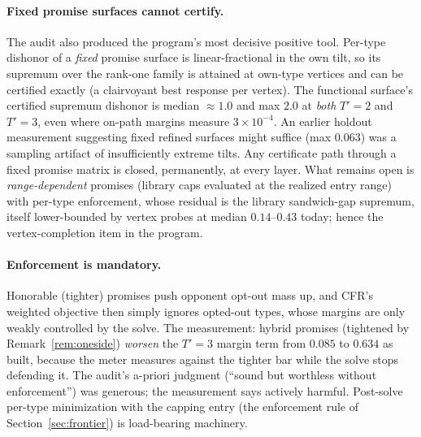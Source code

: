 \documentclass[11pt]{article}
\theoremstyle{plain}
\theoremstyle{definition}
\theoremstyle{remark}
\begin{document}
\paragraph{Fixed promise surfaces cannot certify.} The audit also
produced the program's most decisive positive tool. Per-type dishonor
of a \emph{fixed} promise surface is linear-fractional in the own
tilt, so its supremum over the rank-one family is attained at own-type
vertices and can be certified exactly (a clairvoyant best response per
vertex). The functional surface's certified supremum dishonor is
median ${\approx}1.0$ and max $2.0$ at \emph{both} $T'{=}2$ and
$T'{=}3$, even where on-path margins measure $3\times10^{-4}$. An earlier holdout measurement suggesting fixed
refined surfaces might suffice (max $0.063$) was a sampling artifact
of insufficiently extreme tilts. Any certificate path through a fixed
promise matrix is closed, permanently, at every layer. What remains
open is \emph{range-dependent} promises (library caps evaluated at
the realized entry range) with per-type enforcement, whose residual is
the library sandwich-gap supremum, itself lower-bounded by vertex
probes at median $0.14$--$0.43$ today; hence the vertex-completion
item in the program.

\paragraph{Enforcement is mandatory.} Honorable (tighter) promises
push opponent opt-out mass up, and CFR's weighted objective then
simply ignores opted-out types, whose margins are only weakly
controlled by the solve. The measurement: hybrid promises (tightened
by Remark~\ref{rem:oneside}) \emph{worsen} the $T'{=}3$ margin term
from $0.085$ to $0.634$ as built, because the meter measures against
the tighter bar while the solve stops defending it. The audit's
a-priori judgment (``sound but worthless without enforcement'') was
generous; the measurement says actively harmful. Post-solve per-type
minimization with the capping entry (the enforcement rule of
Section~\ref{sec:frontier}) is load-bearing machinery.
\end{document}
